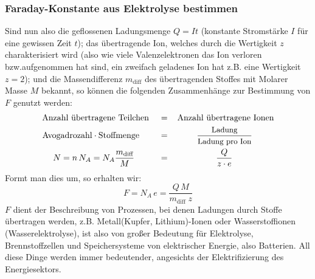 \subsubsection{Faraday-Konstante aus Elektrolyse bestimmen}
Sind nun also die geflossenen Ladungsmenge \(Q=It\) (konstante Stromstärke \(I\) für eine gewissen Zeit \(t\)); das übertragende Ion, welches durch die Wertigkeit \(z\) charakterisiert wird (also wie viele Valenzelektronen das Ion verloren bzw.aufgenommen hat sind, ein zweifach geladenes Ion hat z.B. eine Wertigkeit \(z=2\)); und die Massendifferenz \(m_{\text{diff}}\) des übertragenden Stoffes mit Molarer Masse \(M\) bekannt, so können die folgenden Zusammenhänge zur Bestimmung von \(F\) genutzt werden:
\begin{align}
        \text{Anzahl übertragene Teilchen}\hspace{0.4cm}=&\hspace{0.4cm}\text{Anzahl übertragene Ionen} \nonumber\\
        \mathrm{Avogadrozahl \cdot Stoffmenge} \hspace{0.8cm} =& \hspace{1.2cm}\frac{\text{\small Ladung}}{\text{\small Ladung pro Ion}}\nonumber\\
        \vspace{2cm}
        N=n\,N_A=N_A\frac{m_{\text{diff}}}{M}\hspace{1cm}=&\hspace{2cm}\frac{Q}{z\cdot e}
\end{align}
Formt man dies um, so erhalten wir:
\begin{equation}
    F=N_A\,e=\frac{Q\,M}{m_{\text{diff}}\;z}
    \label{eq:F}
\end{equation}
\(F\) dient der Beschreibung von Prozessen, bei denen Ladungen durch Stoffe übertragen werden, z.B. Metall(Kupfer, Lithium)-Ionen oder Wasserstoffionen (Wasserelektrolyse), ist also von großer Bedeutung für Elektrolyse, Brennstoffzellen und Speichersysteme von elektrischer Energie, also Batterien. All diese Dinge werden immer bedeutender, angesichts der Elektrifizierung des Energiesektors.

